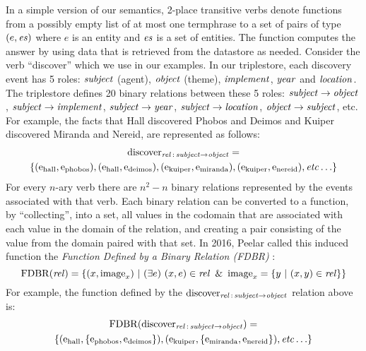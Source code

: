 \documentclass[../main.tex]{subfiles}
\begin{document}
\begin{refsection}
In a simple version of our semantics, 2-place transitive verbs denote functions from a possibly empty list of
at most one termphrase to a set of pairs of type $(e,\operatorname{\mathit{es}})$ where $e$ is an entity and $\operatorname{\mathit{es}}$
is a set of entities. The function computes the answer by using data that is retrieved from the datastore
as needed. Consider the verb ``discover'' which we use in our examples. In our triplestore, each
discovery event has 5 roles: $\operatorname{\mathit{subject}}$ (agent), $\operatorname{\mathit{object}}$ (theme), $\operatorname{\mathit{implement}}$, $\operatorname{\mathit{year}}$
and $\operatorname{\mathit{location}}$. The triplestore defines 20 binary relations between these 5 roles: $\operatorname{\mathit{subject}} \rightarrow \operatorname{\mathit{object}}$,
$\operatorname{\mathit{subject}} \rightarrow \operatorname{\mathit{implement}}$, $\operatorname{\mathit{subject}} \rightarrow \operatorname{\mathit{year}}$, $\operatorname{\mathit{subject}} \rightarrow \operatorname{\mathit{location}}$, $\operatorname{\mathit{object}} \rightarrow \operatorname{\mathit{subject}}$, etc. For example,
the facts that Hall discovered Phobos and Deimos and Kuiper discovered Miranda and Nereid,
are represented as follows:
\begin{multline*}
	\operatorname{discover}_{\operatorname{\mathit{rel}}\,:\,\operatorname{\mathit{subject}} \rightarrow \operatorname{\mathit{object}}} = \\ \{ (\mathrm{e}_{\operatorname{hall}}, \mathrm{e}_{\operatorname{phobos}}), (\mathrm{e}_{\operatorname{hall}}, \mathrm{e}_{\operatorname{deimos}}), (\mathrm{e}_{\operatorname{kuiper}}, \mathrm{e}_{\operatorname{miranda}}), (\mathrm{e}_{\operatorname{kuiper}}, \mathrm{e}_{\operatorname{nereid}}), \operatorname{\mathit{etc\ldots}} \}
\end{multline*}
For every $n$-ary verb there are $n^2 - n$ binary relations represented by the events associated
with that verb.
Each binary relation can be converted to a function, by ``collecting'', into a set, all values
in the codomain that are associated with each value in the domain of the relation, and creating
a pair consisting of the value from the domain paired with that set. In 2016, Peelar called this induced function the {\em Function Defined by a Binary Relation (FDBR)} \cite{peelar2016accommodating}:
\begin{equation*}
	\FDBR{\rel} = \{(x, \image_x)\ |\ (\exists e)\ (x, e) \in \rel\ \&\ \image_x = \{ y\ |\ (x, y) \in \rel \}  \}
\end{equation*}
For example, the function defined by the $\operatorname{discover}_{\operatorname{\mathit{rel}}\,:\,\operatorname{\mathit{subject}} \rightarrow \operatorname{\mathit{object}}}$ relation above is:
\begin{multline*}
	\operatorname{FDBR}({\operatorname{discover}_{\operatorname{\mathit{rel}}\,:\,\operatorname{\mathit{subject}} \rightarrow \operatorname{\mathit{object}}}}) = \\ \{ (\mathrm{e}_{\operatorname{hall}}, \{\mathrm{e}_{\operatorname{phobos}}, \mathrm{e}_{\operatorname{deimos}}\}), (\mathrm{e}_{\operatorname{kuiper}}, \{ \mathrm{e}_{\operatorname{miranda}}, \mathrm{e}_{\operatorname{nereid}} \}),
	\operatorname{\mathit{etc\ldots}} \}
\end{multline*}

\end{refsection}
\end{document}
